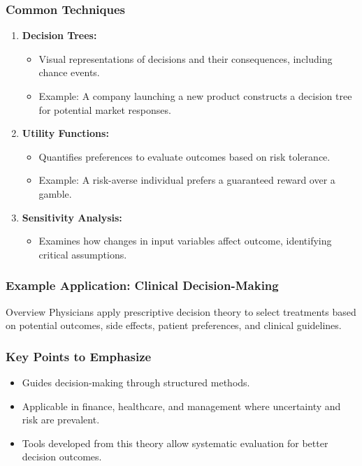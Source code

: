 \documentclass[aspectratio=169]{beamer}
\begin{document}
\begin{frame}[fragile]
    \frametitle{Common Techniques}
    \begin{enumerate}
        \item \textbf{Decision Trees:}
            \begin{itemize}
                \item Visual representations of decisions and their consequences, including chance events.
                \item Example: A company launching a new product constructs a decision tree for potential market responses.
            \end{itemize}
        \item \textbf{Utility Functions:}
            \begin{itemize}
                \item Quantifies preferences to evaluate outcomes based on risk tolerance.
                \item Example: A risk-averse individual prefers a guaranteed reward over a gamble.
            \end{itemize}
        \item \textbf{Sensitivity Analysis:}
            \begin{itemize}
                \item Examines how changes in input variables affect outcome, identifying critical assumptions.
            \end{itemize}
    \end{enumerate}
\end{frame}

\begin{frame}[fragile]
    \frametitle{Example Application: Clinical Decision-Making}
    \begin{block}{Overview}
        Physicians apply prescriptive decision theory to select treatments based on potential outcomes, side effects, patient preferences, and clinical guidelines.
    \end{block}
\end{frame}

\begin{frame}[fragile]
    \frametitle{Key Points to Emphasize}
    \begin{itemize}
        \item Guides decision-making through structured methods.
        \item Applicable in finance, healthcare, and management where uncertainty and risk are prevalent.
        \item Tools developed from this theory allow systematic evaluation for better decision outcomes.
    \end{itemize}
\end{frame}
\end{document}
